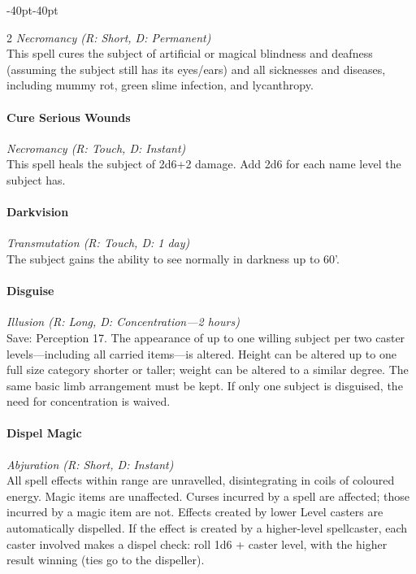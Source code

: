 \documentclass{book}
\begin{document}
\begin{adjustwidth}{-40pt}{-40pt}
\begin{multicols}{2}
\emph{Necromancy (R: Short, D: Permanent)}\\
This spell cures the subject of artificial or magical blindness and
deafness (assuming the subject still has its eyes/ears) and all
sicknesses and diseases, including mummy rot, green slime infection, and
lycanthropy.

\paragraph{Cure Serious Wounds}\label{cure-serious-wounds}

\emph{Necromancy (R: Touch, D: Instant)}\\
This spell heals the subject of 2d6+2 damage. Add 2d6 for each name
level the subject has.

\paragraph{Darkvision}\label{darkvision}

\emph{Transmutation (R: Touch, D: 1 day)}\\
The subject gains the ability to see normally in darkness up to 60'.

\paragraph{Disguise}\label{disguise}

\emph{Illusion (R: Long, D: Concentration---2 hours)}\\
Save: Perception 17. The appearance of up to one willing subject per two
caster levels---including all carried items---is altered. Height can be
altered up to one full size category shorter or taller; weight can be
altered to a similar degree. The same basic limb arrangement must be
kept. If only one subject is disguised, the need for concentration is
waived.

\paragraph{Dispel Magic}\label{dispel-magic}

\emph{Abjuration (R: Short, D: Instant)}\\
All spell effects within range are unravelled, disintegrating in coils
of coloured energy. Magic items are unaffected. Curses incurred by a
spell are affected; those incurred by a magic item are not. Effects
created by lower Level casters are automatically dispelled. If the
effect is created by a higher-level spellcaster, each caster involved
makes a dispel check: roll 1d6 + caster level, with the higher result
winning (ties go to the dispeller).


\end{multicols}
\end{adjustwidth}
\end{document}

